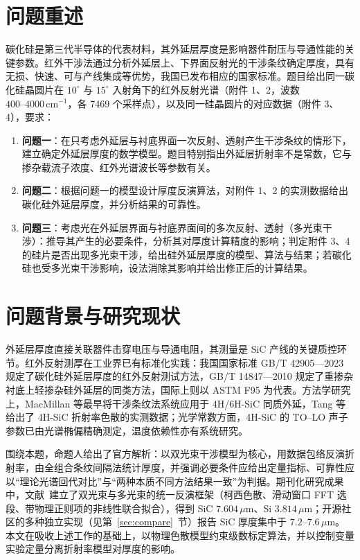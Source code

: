 \documentclass[11pt,a4paper,fontset=fandol]{ctexart}
\newcommand{\um}{\,\mu\mathrm{m}}
\newcommand{\invcm}{\,\mathrm{cm^{-1}}}
\begin{document}
\section{问题重述}

碳化硅是第三代半导体的代表材料，其外延层厚度是影响器件耐压与导通性能的关键参数。红外干涉法通过分析外延层上、下界面反射光的干涉条纹确定厚度，具有无损、快速、可与产线集成等优势，我国已发布相应的国家标准\cite{gbt42905}。题目给出同一碳化硅晶圆片在 $10^\circ$ 与 $15^\circ$ 入射角下的红外反射光谱（附件 1、2，波数 $400\text{--}4000\invcm$，各 7469 个采样点），以及同一硅晶圆片的对应数据（附件 3、4），要求：

\begin{enumerate}[label=（\arabic*）, leftmargin=2.4em, itemsep=0.1em]
    \item \textbf{问题一}：在只考虑外延层与衬底界面一次反射、透射产生干涉条纹的情形下，建立确定外延层厚度的数学模型。题目特别指出外延层折射率不是常数，它与掺杂载流子浓度、红外光谱波长等参数有关。
    \item \textbf{问题二}：根据问题一的模型设计厚度反演算法，对附件 1、2 的实测数据给出碳化硅外延层厚度，并分析结果的可靠性。
    \item \textbf{问题三}：考虑光在外延层界面与衬底界面间的多次反射、透射（多光束干涉）：推导其产生的必要条件，分析其对厚度计算精度的影响；判定附件 3、4 的硅片是否出现多光束干涉，给出硅外延层厚度的模型、算法与结果；若碳化硅也受多光束干涉影响，设法消除其影响并给出修正后的计算结果。
\end{enumerate}

\section{问题背景与研究现状}

外延层厚度直接关联器件击穿电压与导通电阻，其测量是 SiC 产线的关键质控环节。红外反射测厚在工业界已有标准化实践：我国国家标准 GB/T 42905—2023 规定了碳化硅外延层厚度的红外反射测试方法\cite{gbt42905}，GB/T 14847—2010 规定了重掺杂衬底上轻掺杂硅外延层的同类方法\cite{gbt14847}，国际上则以 ASTM F95 为代表\cite{astmf95}。方法学研究上，MacMillan 等最早将干涉条纹法系统应用于 4H/6H-SiC 同质外延\cite{macmillan1998}，Tang 等给出了 4H-SiC 折射率色散的实测数据\cite{tang2009}；光学常数方面，4H-SiC 的 TO--LO 声子参数已由光谱椭偏精确测定\cite{madan2024}，温度依赖性亦有系统研究\cite{tong2018}。

围绕本题，命题人给出了官方解析\cite{xue2026}：以双光束干涉模型为核心，用数据包络反演折射率，由全组合条纹间隔法统计厚度，并强调必要条件应给出定量指标、可靠性应以``理论光谱回代对比''与``两种本质不同方法结果一致''为判据。期刊化研究成果中，文献~\cite{zhu2026}建立了双光束与多光束的统一反演框架（柯西色散、滑动窗口 FFT 选段、带物理正则项的非线性联合拟合），得到 SiC $7.604\um$、Si $3.814\um$；开源社区的多种独立实现（见第~\ref{sec:compare}~节）报告 SiC 厚度集中于 $7.2$--$7.6\um$。本文在吸收上述工作的基础上，以物理色散模型约束级数标定算法，并以控制变量实验定量分离折射率模型对厚度的影响。
\end{document}
